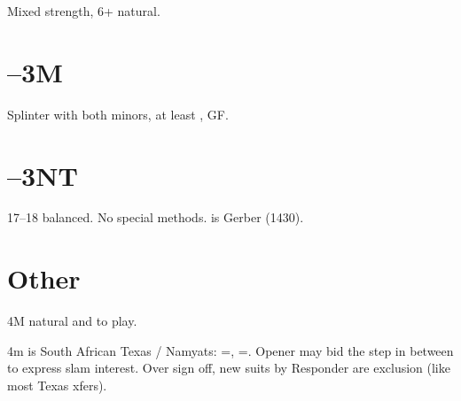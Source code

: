 \documentclass[main]{subfiles}
\begin{document}
Mixed strength, 6+ natural.

\section[1D--3M]{--3M}

Splinter with both minors, at least , GF.

\section[1D--3NT]{--3NT}

17--18 balanced. No special methods.  is Gerber (1430).

\section{Other}

4M natural and to play.

4m is South African Texas / Namyats:  =\hhh, =\sss.  Opener may bid the step in between to express slam interest.  Over sign off, new suits by Responder are exclusion (like most Texas xfers).   
\end{document}
